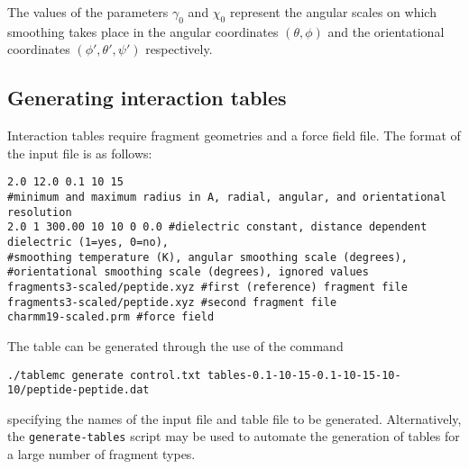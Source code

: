 \documentclass{article}      %
\begin{document}
The values of the parameters $\gamma_0$ and $\chi_0$ represent the angular scales on which smoothing takes place in the angular coordinates $(\theta,\phi)$ and the orientational coordinates $(\phi',\theta',\psi')$ respectively.  

\subsection{Generating interaction tables}

Interaction tables require fragment geometries and a force field file.  The format of the input file is as follows:
\begin{verbatim}
2.0 12.0 0.1 10 15
#minimum and maximum radius in A, radial, angular, and orientational resolution 
2.0 1 300.00 10 10 0 0.0 #dielectric constant, distance dependent dielectric (1=yes, 0=no),
#smoothing temperature (K), angular smoothing scale (degrees),
#orientational smoothing scale (degrees), ignored values
fragments3-scaled/peptide.xyz #first (reference) fragment file
fragments3-scaled/peptide.xyz #second fragment file
charmm19-scaled.prm #force field
\end{verbatim}

The table can be generated through the use of the command
\begin{verbatim}
./tablemc generate control.txt tables-0.1-10-15-0.1-10-15-10-10/peptide-peptide.dat
\end{verbatim}
specifying the names of the input file and table file to be generated.  Alternatively, the \verb+generate-tables+ script may be used to automate the generation of tables for a large number of fragment types.
\end{document}
